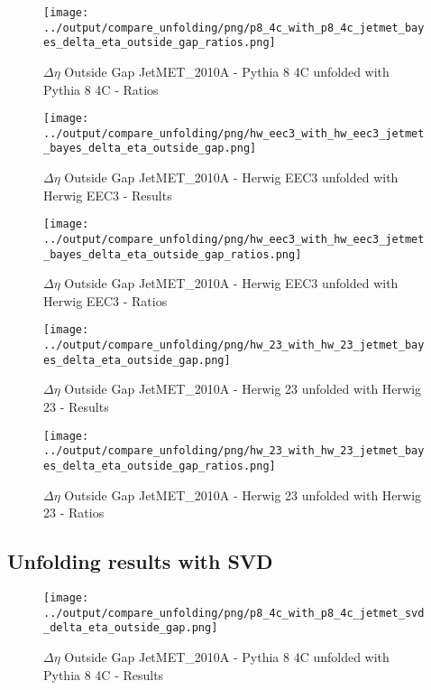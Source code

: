 \documentclass[11pt]{book}
\begin{document}
\begin{figure}[ht]
\centering
\texttt{[image: ../output/compare\_unfolding/png/p8\_4c\_with\_p8\_4c\_jetmet\_bayes\_delta\_eta\_outside\_gap\_ratios.png]}
\caption{$\Delta\eta$ Outside Gap JetMET\_2010A - Pythia 8 4C unfolded with Pythia 8 4C - Ratios}
\label{p8_p8_jetmet_bayes_delta_eta_outside_gap_b}
\end{figure}

\begin{figure}[ht]
\centering
\texttt{[image: ../output/compare\_unfolding/png/hw\_eec3\_with\_hw\_eec3\_jetmet\_bayes\_delta\_eta\_outside\_gap.png]}
\caption{$\Delta\eta$ Outside Gap JetMET\_2010A - Herwig EEC3 unfolded with Herwig EEC3 - Results}
\label{hw_eec3_hw_eec3_jetmet_bayes_delta_eta_outside_gap_a}
\end{figure}

\begin{figure}[ht]
\centering
\texttt{[image: ../output/compare\_unfolding/png/hw\_eec3\_with\_hw\_eec3\_jetmet\_bayes\_delta\_eta\_outside\_gap\_ratios.png]}
\caption{$\Delta\eta$ Outside Gap JetMET\_2010A - Herwig EEC3 unfolded with Herwig EEC3 - Ratios}
\label{hw_eec3_hw_eec3_jetmet_bayes_delta_eta_outside_gap_b}
\end{figure}

\begin{figure}[ht]
\centering
\texttt{[image: ../output/compare\_unfolding/png/hw\_23\_with\_hw\_23\_jetmet\_bayes\_delta\_eta\_outside\_gap.png]}
\caption{$\Delta\eta$ Outside Gap JetMET\_2010A - Herwig 23 unfolded with Herwig 23 - Results}
\label{hw_23_hw_23_jetmet_bayes_delta_eta_outside_gap_a}
\end{figure}

\begin{figure}[ht]
\centering
\texttt{[image: ../output/compare\_unfolding/png/hw\_23\_with\_hw\_23\_jetmet\_bayes\_delta\_eta\_outside\_gap\_ratios.png]}
\caption{$\Delta\eta$ Outside Gap JetMET\_2010A - Herwig 23 unfolded with Herwig 23 - Ratios}
\label{hw_23_hw_23_jetmet_bayes_delta_eta_outside_gap_b}
\end{figure}


\clearpage
\subsection{Unfolding results with SVD}

\begin{figure}[ht]
\centering
\texttt{[image: ../output/compare\_unfolding/png/p8\_4c\_with\_p8\_4c\_jetmet\_svd\_delta\_eta\_outside\_gap.png]}
\caption{$\Delta\eta$ Outside Gap JetMET\_2010A - Pythia 8 4C unfolded with Pythia 8 4C - Results}
\label{p8_p8_jetmet_svd_delta_eta_outside_gap_a}
\end{figure}
\end{document}
